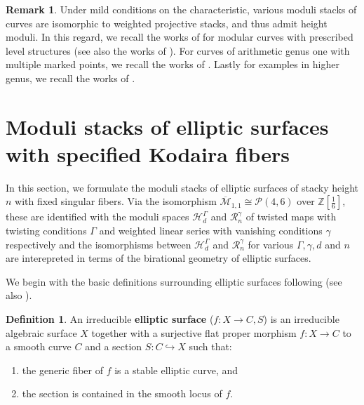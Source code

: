 \documentclass[a4paper,12pt]{amsart}
\theoremstyle{definition}
\newtheorem{defn}[thm]{Definition}
\newtheorem{rmk}[thm]{Remark}
\newcommand{\bZ}{\mathbb{Z}}
\newcommand{\cH}{\mathcal{H}}
\newcommand{\cR}{\mathcal{R}}
\newcommand{\iso}{\cong}
\newcommand{\Me}{\overline{\mathcal{M}}_{1,1}}
\newcommand{\Pc}{\mathcal{P}}
\begin{document}
	\begin{rmk}
		Under mild conditions on the characteristic, various moduli stacks of curves are isomorphic to weighted projective stacks, and thus admit height moduli. In this regard, we recall the works of \cite{Behrens, Stojanoska, HMe, Meier} for modular curves with prescribed level structures (see also the works of \cite{KM, Conrad, Niles}). For curves of arithmetic genus one with multiple marked points, we recall the works of \cite{Smyth, Smyth2, LP}. Lastly for examples in higher genus, we recall the works of \cite{Stankova, Fedorchuk, HP2}.
	\end{rmk}
	
	
	
	\section{Moduli stacks of elliptic surfaces with specified Kodaira fibers}
	\label{sec:Mod_Wss_Surf}
	
	
	In this section, we formulate the moduli stacks of elliptic surfaces of stacky height $n$ with fixed singular fibers. Via the isomorphism $\Me \iso \Pc(4,6)$ over $\bZ\left[\frac{1}{6}\right]$, these are identified with the moduli spaces $\cH^\Gamma_d$ and $\cR^\gamma_n$ of twisted maps with twisting conditions $\Gamma$ and weighted linear series with vanishing conditions $\gamma$ respectively and the isomorphisms between $\cH^\Gamma_d$ and $\cR^\gamma_n$ for various $\Gamma, \gamma, d$ and $n$ are interepreted in terms of the birational geometry of elliptic surfaces. 
	
	
	\medskip
	
	We begin with the basic definitions surrounding elliptic surfaces following \cite{Miranda2, SS} (see also \cite{Silverman, Liu}).
	
	\begin{defn}
		An irreducible \textbf{elliptic surface} ($f: X \to C, S$) is an irreducible algebraic surface $X$ together with a surjective flat proper morphism $f: X \to C$ to a smooth curve $C$ and a section $S: C \hookrightarrow X$ such that:
		\begin{enumerate} 
			\item the generic fiber of $f$ is a stable elliptic curve, and
			\item the section is contained in the smooth locus of $f$. 
		\end{enumerate}
		
	\end{defn}
	
\end{document}
